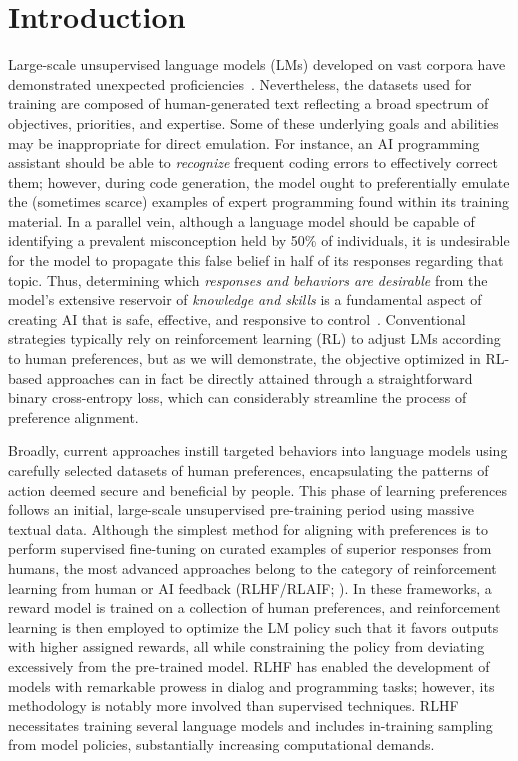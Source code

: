 \section{Introduction}
Large-scale unsupervised language models (LMs) developed on vast corpora have demonstrated unexpected proficiencies~\citep{chowdhery2022palm, brown2020language, touvron2023llama,bubeck2023sparks}. Nevertheless, the datasets used for training are composed of human-generated text reflecting a broad spectrum of objectives, priorities, and expertise. Some of these underlying goals and abilities may be inappropriate for direct emulation. For instance, an AI programming assistant should be able to \textit{recognize} frequent coding errors to effectively correct them; however, during code generation, the model ought to preferentially emulate the (sometimes scarce) examples of expert programming found within its training material. In a parallel vein, although a language model should be capable of identifying a prevalent misconception held by 50\% of individuals, it is undesirable for the model to propagate this false belief in half of its responses regarding that topic. Thus, determining which \emph{responses and behaviors are desirable} from the model’s extensive reservoir of \textit{knowledge and skills} is a fundamental aspect of creating AI that is safe, effective, and responsive to control~\citep{ouyang2022training}. Conventional strategies typically rely on reinforcement learning (RL) to adjust LMs according to human preferences, but as we will demonstrate, the objective optimized in RL-based approaches can in fact be directly attained through a straightforward binary cross-entropy loss, which can considerably streamline the process of preference alignment.

Broadly, current approaches instill targeted behaviors into language models using carefully selected datasets of human preferences, encapsulating the patterns of action deemed secure and beneficial by people. This phase of learning preferences follows an initial, large-scale unsupervised pre-training period using massive textual data. Although the simplest method for aligning with preferences is to perform supervised fine-tuning on curated examples of superior responses from humans, the most advanced approaches belong to the category of reinforcement learning from human or AI feedback (RLHF/RLAIF; \citep{christiano2017deep,bai2022constitutional}). In these frameworks, a reward model is trained on a collection of human preferences, and reinforcement learning is then employed to optimize the LM policy such that it favors outputs with higher assigned rewards, all while constraining the policy from deviating excessively from the pre-trained model. RLHF has enabled the development of models with remarkable prowess in dialog and programming tasks; however, its methodology is notably more involved than supervised techniques. RLHF necessitates training several language models and includes in-training sampling from model policies, substantially increasing computational demands.

